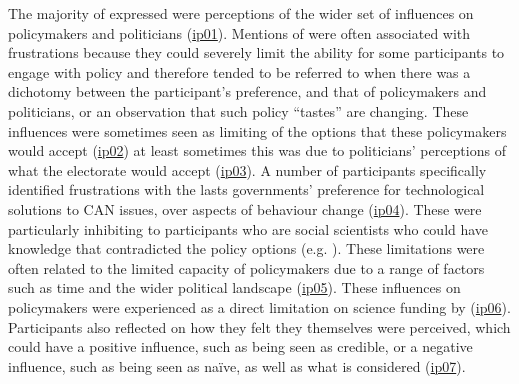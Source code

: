 The majority of \skipers{} expressed were perceptions of the wider set of influences on policymakers and politicians (\hyperref[tab:resskipers]{ip01}). Mentions of \skipers{} were often associated with frustrations because they could severely limit the ability for some participants to engage with policy and therefore  tended to be referred to when there was a dichotomy between the participant's preference, and that of policymakers and politicians, or an observation that such policy ``tastes'' are changing. These influences were sometimes seen as limiting of the options that these policymakers would accept (\hyperref[tab:resskipers]{ip02}) at least sometimes this was due to politicians' perceptions of what the electorate would accept (\hyperref[tab:resskipers]{ip03}). A number of participants specifically identified frustrations with the lasts governments' preference for technological solutions to CAN issues, over aspects of behaviour change (\hyperref[tab:resskipers]{ip04}). These were particularly inhibiting to participants who are social scientists who could have knowledge that contradicted the policy options (e.g. ). These limitations were often related to the limited capacity of policymakers due to a range of factors such as time and the wider political landscape (\hyperref[tab:resskipers]{ip05}). These influences on policymakers were experienced as a direct limitation on science funding by  (\hyperref[tab:resskipers]{ip06}). Participants also reflected on how they felt they themselves were perceived, which could have a positive influence, such as being seen as credible, or a negative influence, such as being seen as na\"ive, as well as what is considered  (\hyperref[tab:resskipers]{ip07}).

